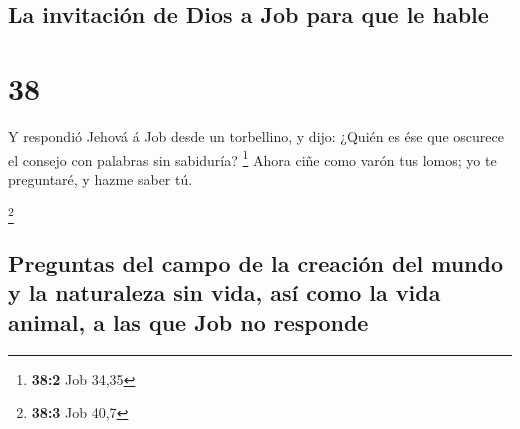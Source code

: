 \hypertarget{la-invitaciuxf3n-de-dios-a-job-para-que-le-hable}{%
\subsection{La invitación de Dios a Job para que le
hable}\label{la-invitaciuxf3n-de-dios-a-job-para-que-le-hable}}

\hypertarget{section-37}{%
\section{38}\label{section-37}}

 Y respondió Jehová á Job desde un torbellino, y dijo:
 ¿Quién es ése que oscurece el consejo con palabras sin
sabiduría? \footnote{\textbf{38:2} Job 34,35}  Ahora ciñe
como varón tus lomos; yo te preguntaré, y hazme saber tú.

\footnote{\textbf{38:3} Job 40,7}

\hypertarget{preguntas-del-campo-de-la-creaciuxf3n-del-mundo-y-la-naturaleza-sin-vida-asuxed-como-la-vida-animal-a-las-que-job-no-responde}{%
\subsection{Preguntas del campo de la creación del mundo y la naturaleza
sin vida, así como la vida animal, a las que Job no
responde}\label{preguntas-del-campo-de-la-creaciuxf3n-del-mundo-y-la-naturaleza-sin-vida-asuxed-como-la-vida-animal-a-las-que-job-no-responde}}

